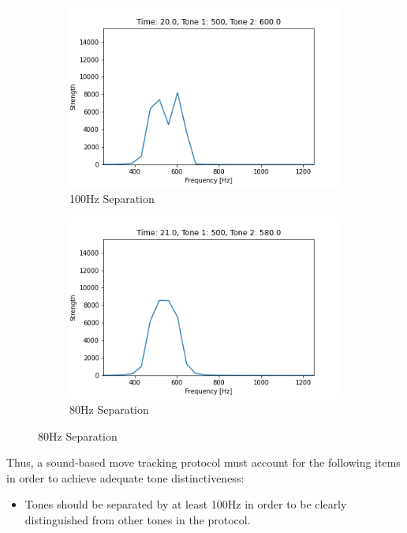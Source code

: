 \begin{figure}[h]
\begin{subfigure}{0.5\textwidth}
        \vspace*{2mm}
    \end{subfigure}\\
    \begin{subfigure}{0.5\textwidth}
        \centering
        \caption{100Hz Separation}
        \label{fig:tone-sep-100}
        \includegraphics[width=.90\linewidth]{Figures/4 Protocol Design/Tone Distinctiveness/20.03.png}
        \vspace*{2mm}
    \end{subfigure}%
    \begin{subfigure}{0.5\textwidth}
        \centering
        \caption{80Hz Separation}
        \label{fig:tone-sep-80}
        \includegraphics[width=.90\linewidth]{Figures/4 Protocol Design/Tone Distinctiveness/21.01.png}
        \vspace*{2mm}
    \end{subfigure}%
\end{figure}

Thus, a sound-based move tracking protocol must account for the following items in order to achieve adequate tone distinctiveness:
\begin{itemize}
    \item Tones should be separated by at least 100Hz in order to be clearly distinguished from other tones in the protocol.
\end{itemize}


